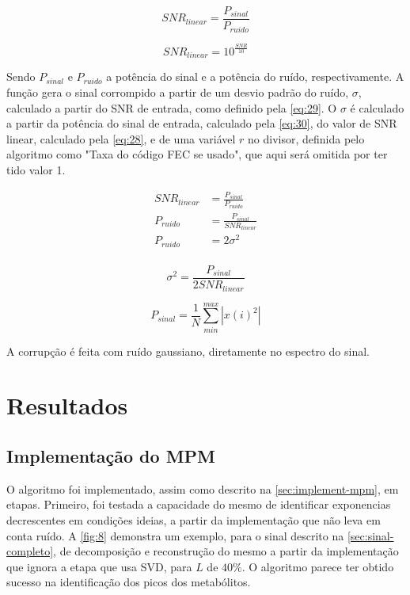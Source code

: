 \documentclass[12pt]{article}
\begin{document}
\begin{equation} \label{eq:26}
    SNR_{linear} = \frac{P_{sinal}}{P_{ruido}}
\end{equation}

\begin{equation} \label{eq:28}
    SNR_{linear} = 10^{\frac{SNR}{10}}
\end{equation}

Sendo $P_{sinal}$ e $P_{ruido}$ a potência do sinal e a potência do ruído, respectivamente. A função gera o sinal corrompido a partir 
de um desvio padrão do ruído, $\sigma$, calculado a partir do SNR de entrada, como definido pela \autoref{eq:29}. 
O $\sigma$ é calculado a partir da potência do sinal de entrada, calculado pela \autoref{eq:30}, do valor de SNR linear, calculado pela 
\autoref{eq:28}, e de uma variável $r$ no divisor, definida pelo algoritmo como "Taxa do código FEC se usado", que aqui será omitida por 
ter tido valor 1.

\begin{equation} \label{eq:31}
    \begin{aligned}
        SNR_{linear} & = \frac{P_{sinal}}{P_{ruido}} \\
        P_{ruido} & = \frac{P_{sinal}}{SNR_{linear}} \\
        P_{ruido} & = 2\sigma^2 \\
    \end{aligned}
\end{equation}

\begin{equation} \label{eq:29}
    \sigma^2 = \frac{P_{sinal}}{2 SNR_{linear}}
\end{equation}

\begin{equation} \label{eq:30}
    P_{sinal} = \frac{1}{N} \sum_{min}^{max} |x(i)^2|
\end{equation}

A corrupção é feita com ruído gaussiano, diretamente no espectro do sinal.


\section{Resultados}

\subsection{Implementação do MPM}

O algoritmo foi implementado, assim como descrito na \autoref{sec:implement-mpm}, em etapas. Primeiro, foi testada a capacidade do mesmo 
de identificar exponencias decrescentes em condições ideias, a partir da implementação que não leva em conta ruído. A \autoref{fig:8} 
demonstra um exemplo, para o sinal descrito na \autoref{sec:sinal-completo}, de decomposição e reconstrução do mesmo a partir da implementação
que ignora a etapa que usa SVD, para $L$ de $40\%$. O algoritmo parece ter obtido sucesso na identificação dos picos dos metabólitos.
\end{document}
